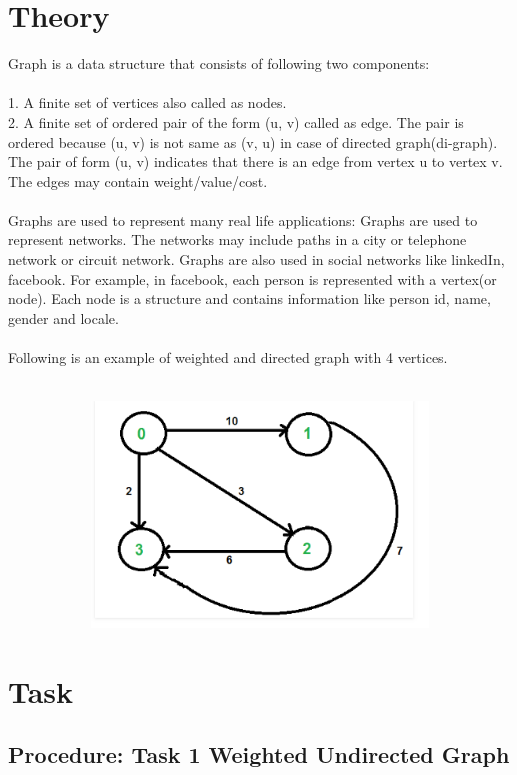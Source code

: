 \documentclass[11pt]{article}            %
\begin{document}
\section{Theory }              
\justify Graph is a data structure that consists of following two components:\\~\\
1. A finite set of vertices also called as nodes.\\
2. A finite set of ordered pair of the form (u, v) called as edge. The pair is ordered because (u, v) is not same as (v, u) in case of directed graph(di-graph). The pair of form (u, v) indicates that there is an edge from vertex u to vertex v. The edges may contain weight/value/cost.\\~\\
Graphs are used to represent many real life applications: Graphs are used to represent networks. The networks may include paths in a city or telephone network or circuit network. Graphs are also used in social networks like linkedIn, facebook. For example, in facebook, each person is represented with a vertex(or node). Each node is a structure and contains information like person id, name, gender and locale.\\~\\
Following is an example of weighted and directed graph with 4 vertices.\\~\\
\begin{figure}[H]
\centering
  \includegraphics[width=12cm,height=6cm,keepaspectratio]{5.png}    
\end{figure}
\section{Task}  
\subsection{Procedure: Task 1 Weighted Undirected Graph}
\end{document}
